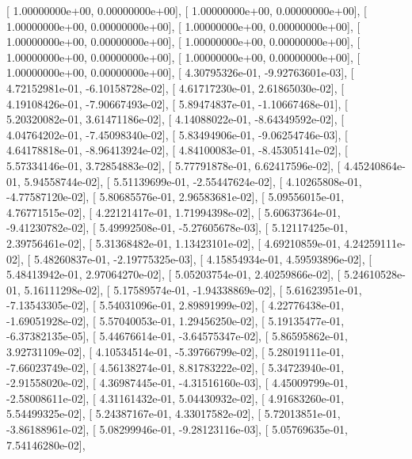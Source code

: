 \documentclass{article}
\begin{document}
       [  1.00000000e+00,   0.00000000e+00],
       [  1.00000000e+00,   0.00000000e+00],
       [  1.00000000e+00,   0.00000000e+00],
       [  1.00000000e+00,   0.00000000e+00],
       [  1.00000000e+00,   0.00000000e+00],
       [  1.00000000e+00,   0.00000000e+00],
       [  1.00000000e+00,   0.00000000e+00],
       [  1.00000000e+00,   0.00000000e+00],
       [  1.00000000e+00,   0.00000000e+00],
       [  4.30795326e-01,  -9.92763601e-03],
       [  4.72152981e-01,  -6.10158728e-02],
       [  4.61717230e-01,   2.61865030e-02],
       [  4.19108426e-01,  -7.90667493e-02],
       [  5.89474837e-01,  -1.10667468e-01],
       [  5.20320082e-01,   3.61471186e-02],
       [  4.14088022e-01,  -8.64349592e-02],
       [  4.04764202e-01,  -7.45098340e-02],
       [  5.83494906e-01,  -9.06254746e-03],
       [  4.64178818e-01,  -8.96413924e-02],
       [  4.84100083e-01,  -8.45305141e-02],
       [  5.57334146e-01,   3.72854883e-02],
       [  5.77791878e-01,   6.62417596e-02],
       [  4.45240864e-01,   5.94558744e-02],
       [  5.51139699e-01,  -2.55447624e-02],
       [  4.10265808e-01,  -4.77587120e-02],
       [  5.80685576e-01,   2.96583681e-02],
       [  5.09556015e-01,   4.76771515e-02],
       [  4.22121417e-01,   1.71994398e-02],
       [  5.60637364e-01,  -9.41230782e-02],
       [  5.49992508e-01,  -5.27605678e-03],
       [  5.12117425e-01,   2.39756461e-02],
       [  5.31368482e-01,   1.13423101e-02],
       [  4.69210859e-01,   4.24259111e-02],
       [  5.48260837e-01,  -2.19775325e-03],
       [  4.15854934e-01,   4.59593896e-02],
       [  5.48413942e-01,   2.97064270e-02],
       [  5.05203754e-01,   2.40259866e-02],
       [  5.24610528e-01,   5.16111298e-02],
       [  5.17589574e-01,  -1.94338869e-02],
       [  5.61623951e-01,  -7.13543305e-02],
       [  5.54031096e-01,   2.89891999e-02],
       [  4.22776438e-01,  -1.69051928e-02],
       [  5.57040053e-01,   1.29456250e-02],
       [  5.19135477e-01,  -6.37382135e-05],
       [  5.44676614e-01,  -3.64575347e-02],
       [  5.86595862e-01,   3.92731109e-02],
       [  4.10534514e-01,  -5.39766799e-02],
       [  5.28019111e-01,  -7.66023749e-02],
       [  4.56138274e-01,   8.81783222e-02],
       [  5.34723940e-01,  -2.91558020e-02],
       [  4.36987445e-01,  -4.31516160e-03],
       [  4.45009799e-01,  -2.58008611e-02],
       [  4.31161432e-01,   5.04430932e-02],
       [  4.91683260e-01,   5.54499325e-02],
       [  5.24387167e-01,   4.33017582e-02],
       [  5.72013851e-01,  -3.86188961e-02],
       [  5.08299946e-01,  -9.28123116e-03],
       [  5.05769635e-01,   7.54146280e-02],
\end{document}

